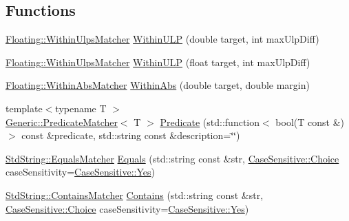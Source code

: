 \subsection*{Functions}
\begin{DoxyCompactItemize}
\item 
\mbox{\hyperlink{struct_catch_1_1_matchers_1_1_floating_1_1_within_ulps_matcher}{Floating\+::\+Within\+Ulps\+Matcher}} \mbox{\hyperlink{namespace_catch_1_1_matchers_ae895591bd78a7d0ce4cdf3cf40d89ab5}{Within\+U\+LP}} (double target, int max\+Ulp\+Diff)
\item 
\mbox{\hyperlink{struct_catch_1_1_matchers_1_1_floating_1_1_within_ulps_matcher}{Floating\+::\+Within\+Ulps\+Matcher}} \mbox{\hyperlink{namespace_catch_1_1_matchers_ab87ee77e5349fac450d1e631dee86496}{Within\+U\+LP}} (float target, int max\+Ulp\+Diff)
\item 
\mbox{\hyperlink{struct_catch_1_1_matchers_1_1_floating_1_1_within_abs_matcher}{Floating\+::\+Within\+Abs\+Matcher}} \mbox{\hyperlink{namespace_catch_1_1_matchers_a4c9ea76d47d02de0cf2d354c87c26e95}{Within\+Abs}} (double target, double margin)
\item 
{\footnotesize template$<$typename T $>$ }\\\mbox{\hyperlink{class_catch_1_1_matchers_1_1_generic_1_1_predicate_matcher}{Generic\+::\+Predicate\+Matcher}}$<$ T $>$ \mbox{\hyperlink{namespace_catch_1_1_matchers_a034f2de6c0aac6f4a662fdf2558aedce}{Predicate}} (std\+::function$<$ bool(T const \&)$>$ const \&predicate, std\+::string const \&description=\char`\"{}\char`\"{})
\item 
\mbox{\hyperlink{struct_catch_1_1_matchers_1_1_std_string_1_1_equals_matcher}{Std\+String\+::\+Equals\+Matcher}} \mbox{\hyperlink{namespace_catch_1_1_matchers_af8af7dfc338335ed4c788cb1b37fc59f}{Equals}} (std\+::string const \&str, \mbox{\hyperlink{struct_catch_1_1_case_sensitive_aad49d3aee2d97066642fffa919685c6a}{Case\+Sensitive\+::\+Choice}} case\+Sensitivity=\mbox{\hyperlink{struct_catch_1_1_case_sensitive_aad49d3aee2d97066642fffa919685c6aa7c5550b69ec3c502e6f609b67f9613c6}{Case\+Sensitive\+::\+Yes}})
\item 
\mbox{\hyperlink{struct_catch_1_1_matchers_1_1_std_string_1_1_contains_matcher}{Std\+String\+::\+Contains\+Matcher}} \mbox{\hyperlink{namespace_catch_1_1_matchers_a1f6c2accdc6cd75a84d7112dcad647b4}{Contains}} (std\+::string const \&str, \mbox{\hyperlink{struct_catch_1_1_case_sensitive_aad49d3aee2d97066642fffa919685c6a}{Case\+Sensitive\+::\+Choice}} case\+Sensitivity=\mbox{\hyperlink{struct_catch_1_1_case_sensitive_aad49d3aee2d97066642fffa919685c6aa7c5550b69ec3c502e6f609b67f9613c6}{Case\+Sensitive\+::\+Yes}})

\end{DoxyCompactItemize}
